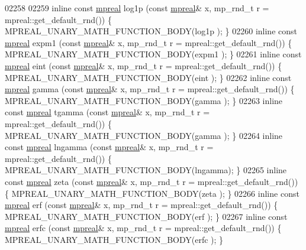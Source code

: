 \begin{DoxyCode}
{{02258 
02259 \textcolor{keyword}{inline} \textcolor{keyword}{const} \hyperlink{classmpfr_1_1mpreal}{mpreal} log1p   (\textcolor{keyword}{const} \hyperlink{classmpfr_1_1mpreal}{mpreal}& x, mp\_rnd\_t r = mpreal::get\_default\_rnd()) \{   
      MPREAL\_UNARY\_MATH\_FUNCTION\_BODY(log1p  );    \}
02260 \textcolor{keyword}{inline} \textcolor{keyword}{const} \hyperlink{classmpfr_1_1mpreal}{mpreal} expm1   (\textcolor{keyword}{const} \hyperlink{classmpfr_1_1mpreal}{mpreal}& x, mp\_rnd\_t r = mpreal::get\_default\_rnd()) \{   
      MPREAL\_UNARY\_MATH\_FUNCTION\_BODY(expm1  );    \}
02261 \textcolor{keyword}{inline} \textcolor{keyword}{const} \hyperlink{classmpfr_1_1mpreal}{mpreal} eint    (\textcolor{keyword}{const} \hyperlink{classmpfr_1_1mpreal}{mpreal}& x, mp\_rnd\_t r = mpreal::get\_default\_rnd()) \{   
      MPREAL\_UNARY\_MATH\_FUNCTION\_BODY(eint   );    \}
02262 \textcolor{keyword}{inline} \textcolor{keyword}{const} \hyperlink{classmpfr_1_1mpreal}{mpreal} gamma   (\textcolor{keyword}{const} \hyperlink{classmpfr_1_1mpreal}{mpreal}& x, mp\_rnd\_t r = mpreal::get\_default\_rnd()) \{   
      MPREAL\_UNARY\_MATH\_FUNCTION\_BODY(gamma  );    \}
02263 \textcolor{keyword}{inline} \textcolor{keyword}{const} \hyperlink{classmpfr_1_1mpreal}{mpreal} tgamma  (\textcolor{keyword}{const} \hyperlink{classmpfr_1_1mpreal}{mpreal}& x, mp\_rnd\_t r = mpreal::get\_default\_rnd()) \{   
      MPREAL\_UNARY\_MATH\_FUNCTION\_BODY(gamma  );    \}
02264 \textcolor{keyword}{inline} \textcolor{keyword}{const} \hyperlink{classmpfr_1_1mpreal}{mpreal} lngamma (\textcolor{keyword}{const} \hyperlink{classmpfr_1_1mpreal}{mpreal}& x, mp\_rnd\_t r = mpreal::get\_default\_rnd()) \{   
      MPREAL\_UNARY\_MATH\_FUNCTION\_BODY(lngamma);    \}
02265 \textcolor{keyword}{inline} \textcolor{keyword}{const} \hyperlink{classmpfr_1_1mpreal}{mpreal} zeta    (\textcolor{keyword}{const} \hyperlink{classmpfr_1_1mpreal}{mpreal}& x, mp\_rnd\_t r = mpreal::get\_default\_rnd()) \{   
      MPREAL\_UNARY\_MATH\_FUNCTION\_BODY(zeta   );    \}
02266 \textcolor{keyword}{inline} \textcolor{keyword}{const} \hyperlink{classmpfr_1_1mpreal}{mpreal} erf     (\textcolor{keyword}{const} \hyperlink{classmpfr_1_1mpreal}{mpreal}& x, mp\_rnd\_t r = mpreal::get\_default\_rnd()) \{   
      MPREAL\_UNARY\_MATH\_FUNCTION\_BODY(erf    );    \}
02267 \textcolor{keyword}{inline} \textcolor{keyword}{const} \hyperlink{classmpfr_1_1mpreal}{mpreal} erfc    (\textcolor{keyword}{const} \hyperlink{classmpfr_1_1mpreal}{mpreal}& x, mp\_rnd\_t r = mpreal::get\_default\_rnd()) \{   
      MPREAL\_UNARY\_MATH\_FUNCTION\_BODY(erfc   );    \}
}}
\end{DoxyCode}
